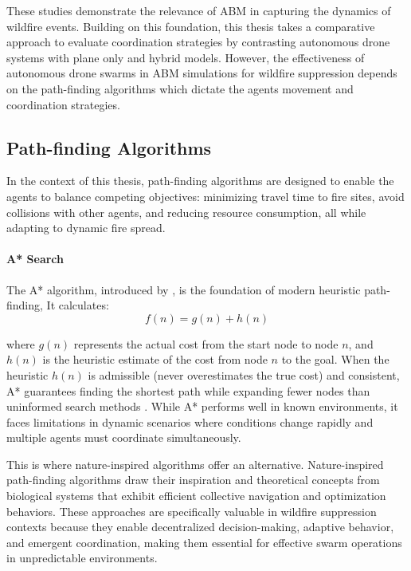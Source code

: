 \documentclass[11pt, a4paper]{article}
\begin{document}
These studies demonstrate the relevance of ABM in capturing the dynamics of wildfire events. Building on this foundation, this thesis takes a comparative approach to evaluate coordination strategies by contrasting autonomous drone systems with plane only and hybrid models. However, the effectiveness of autonomous drone swarms in ABM simulations for wildfire suppression depends on the path-finding algorithms which dictate the agents movement and coordination strategies.

\subsection{Path-finding Algorithms}

In the context of this thesis, path-finding algorithms are designed to enable the agents to balance competing objectives: minimizing travel time to fire sites, avoid collisions with other agents, and reducing resource consumption, all while adapting to dynamic fire spread.

\paragraph{A* Search} The A* algorithm, introduced by \citet*{heuristic}, is the foundation of modern heuristic path-finding, It calculates:
\begin{equation}
  f(n) = g(n) + h(n)
\end{equation}

where $g(n)$ represents the actual cost from the start node to node $n$, and $h(n)$ is the heuristic estimate of the cost from node $n$ to the goal. When the heuristic $h(n)$ is admissible (never overestimates the true cost) and consistent, A* guarantees finding the shortest path while expanding fewer nodes than uninformed search methods \citep{heuristic}. 
While A* performs well in known environments, it faces limitations in dynamic scenarios where conditions change rapidly and multiple agents must coordinate simultaneously.

This is where nature-inspired algorithms offer an alternative. Nature-inspired path-finding algorithms draw their inspiration and theoretical concepts from biological systems that exhibit efficient collective navigation and optimization behaviors. These approaches are specifically valuable in wildfire suppression contexts because they enable decentralized decision-making, adaptive behavior, and emergent coordination, making them essential for effective swarm operations in unpredictable environments.
\end{document}

